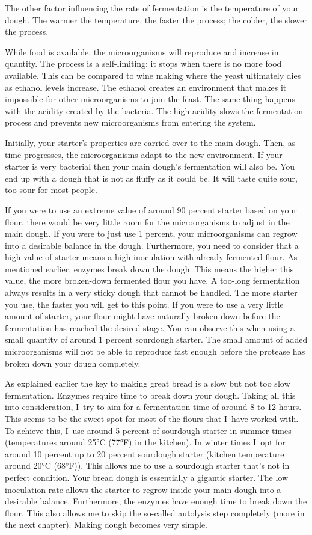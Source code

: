 The other factor influencing the rate of fermentation is the temperature of
your dough. The warmer the temperature, the faster the process; the colder, the
slower the process.

While food is available, the microorganisms will reproduce and increase in
quantity. The process is a self-limiting: it stops when there is no
more food available. This can be compared to wine making where
the yeast ultimately dies as ethanol levels increase. The ethanol creates an
environment that makes it impossible for other
microorganisms to join the feast. The same thing happens with the acidity
created by the bacteria. The high acidity slows the fermentation process and
prevents new microorganisms from entering the system.

Initially, your starter's properties are carried over to the main dough. Then,
as time progresses, the microorganisms adapt to the new environment. If your
starter is very bacterial then your main dough's fermentation will also be. You
end up with a dough that is not as fluffy as it could be. It will taste quite
sour, too sour for most people.

If you were to use an extreme value of around 90 percent starter based on your flour, there
would be very little room for the microorganisms to adjust in the main dough.
If you were to just use 1 percent, your microorganisms can regrow into a
desirable balance in the dough. Furthermore, you need to consider that a high value
of starter means a high inoculation with already fermented flour. As
mentioned earlier, enzymes break down the dough. This means the higher this
value, the more broken-down fermented flour you have. A too-long fermentation
always results in a very sticky dough that cannot be handled. The more
starter you use, the faster you will get to this point. If you were to use a
very little amount of starter, your flour might have naturally broken down
before the fermentation has reached the desired stage. You can observe this
when using a small quantity of around 1 percent sourdough starter. The small
amount of added microorganisms will not be able to reproduce fast enough
before the protease has broken down your dough completely.

As explained earlier the key to making great bread is a slow but not too slow
fermentation. Enzymes require time to break down your dough. Taking all this
into consideration, I~try to aim for a fermentation time of around 8 to 12 hours. This seems to be
the sweet spot for most of the flours that I~have worked with. To achieve this,
I~use around 5 percent of sourdough starter in summer times (temperatures
around 25°C (77°F) in the kitchen). In winter times I~opt for around 10 percent
up to 20 percent sourdough starter (kitchen temperature around 20°C (68°F)). This
allows me to use a sourdough starter that's not in perfect condition. Your
bread dough is essentially a gigantic starter. The low inoculation rate allows
the starter to regrow inside your main dough into a desirable balance.
Furthermore, the enzymes have enough time to break down the flour. This also
allows me to skip the so-called autolysis step completely (more in the next chapter).
Making dough becomes very simple.

